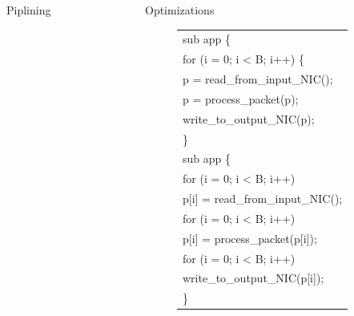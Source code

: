 \documentclass[final]{beamer}
\newlength{\sepwid}
\newlength{\onecolwid}
\newlength{\twocolwid}
\begin{document}
\begin{frame}
\begin{columns}[t]
\begin{column}{\onecolwid}
\begin{exampleblock}{Piplining}
\end{exampleblock}




\end{column} %

\begin{column}{\sepwid}\end{column} %

\begin{column}{\twocolwid} %




\begin{exampleblock}{Optimizations}
\begin{multicols}{3}

\begin{figure}[ht]
\begin{small}
\begin{tabular}[b]{p{\onecolwid}}
sub app \{ \\
\hspace{0.2\sepwid}for (i = 0; i < B; i++) \{ \\
\hspace{0.4\sepwid}p = read\_from\_input\_NIC(); \\
\hspace{0.4\sepwid}p = process\_packet(p); \\
\hspace{0.4\sepwid}write\_to\_output\_NIC(p); \\
\hspace{0.2\sepwid}\} 
\\
sub app \{\\
\hspace{0.2\sepwid}for (i = 0; i < B; i++)\\
\hspace{0.4\sepwid}p[i] = read\_from\_input\_NIC();\\
\hspace{0.2\sepwid}for (i = 0; i < B; i++)\\
\hspace{0.4\sepwid}p[i] = process\_packet(p[i]);\\
\hspace{0.2\sepwid}for (i = 0; i < B; i++)\\
\hspace{0.4\sepwid}write\_to\_output\_NIC(p[i]);\\
\}\\
\end{tabular}
\end{small}
\end{figure}


\end{multicols}
\end{exampleblock}
\end{column}
\end{columns}
\end{frame}
\end{document}
